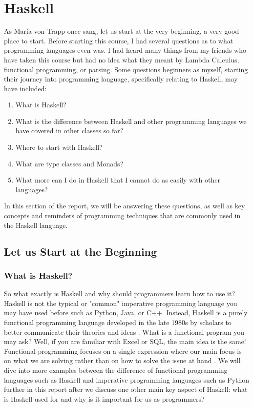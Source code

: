 \documentclass{article}
\begin{document}
\section{Haskell}\label{haskell}

As Maria von Trapp once sang, let us start at the very beginning, a very good place to start. Before starting this course, I had several questions as to what programming languages even was. I had heard many things from my friends who have taken this course but had no idea what they meant by Lambda Calculus, functional programming, or parsing. Some questions beginners as myself, starting their journey into programming language, specifically relating to Haskell, may have included:
\begin{enumerate}
    \item What is Haskell?
    \item What is the difference between Haskell and other programming languages we have covered in other classes so far?
    \item Where to start with Haskell?
    \item What are type classes and Monads?
    \item What more can I do in Haskell that I cannot do as easily with other languages?
    
\end{enumerate}
\noindent
In this section of the report, we will be answering these questions, as well as key concepts and reminders of programming techniques that are commonly used in the Haskell language.

\subsection{Let us Start at the Beginning}

\subsubsection{What is Haskell?}
So what exactly is Haskell and why should programmers learn how to use it? Haskell is not the typical or "common" imperative programming language you may have used before such as Python, Java, or C++. Instead, Haskell is a purely functional programming language developed in the late 1980s by scholars to better communicate their theories and ideas \cite{UPenn}. What is a functional program you may ask? Well, if you are familiar with Excel or SQL, the main idea is the same! Functional programming focuses on a single expression where our main focus is on what we are solving rather than on how to solve the issue at hand \cite{Haskell.org}. We will dive into more examples between the difference of functional programming languages such as Haskell and imperative programming languages such as Python further in this report after we discuss one other main key aspect of Haskell: what is Haskell used for and why is it important for us as programmers?
\end{document}
